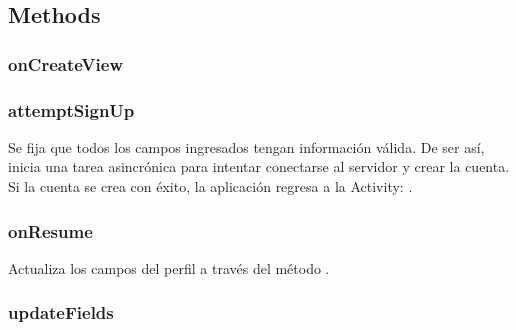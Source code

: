 \documentclass[letterpaper,10pt,english]{sphinxmanual}
\begin{document}
\subsection{Methods}
\label{Fragments/ProfileFragment:methods}

\subsubsection{onCreateView}
\label{Fragments/ProfileFragment:oncreateview}

\subsubsection{attemptSignUp}
\label{Fragments/ProfileFragment:attemptsignup}

\begin{fulllineitems}
\label{Fragments/ProfileFragment:com.fiuba.tallerii.jobify.ProfileFragment.attemptSignUp()}
Se fija que todos los campos ingresados tengan información válida. De ser así, inicia una tarea asincrónica para intentar conectarse al servidor y crear la cuenta. Si la cuenta se crea con éxito, la aplicación regresa a la Activity: .

\end{fulllineitems}



\subsubsection{onResume}
\label{Fragments/ProfileFragment:onresume}

\begin{fulllineitems}
\label{Fragments/ProfileFragment:com.fiuba.tallerii.jobify.ProfileFragment.onResume()}
Actualiza los campos del perfil a través del método .

\end{fulllineitems}



\subsubsection{updateFields}
\label{Fragments/ProfileFragment:updatefields}
\end{document}
